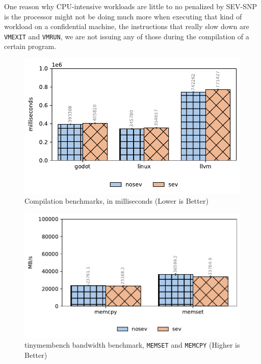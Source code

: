 \documentclass[twocolumn]{article}
\begin{document}
One reason why CPU-intensive workloads are little to no penalized by SEV-SNP is the processor might not be doing much more when executing that kind of workload on a confidential machine, the instructions that really slow down are \texttt{VMEXIT} and \texttt{VMRUN}, we are not issuing any of those during the compilation of a certain program.

\begin{figure}[ht]
    \centering
    \includegraphics[width=\columnwidth]{img/compilation-benchmark.pdf}
    \caption{Compilation benchmarks, in milliseconds (Lower is Better)}
    \label{fig:tb-compilation}
\end{figure}

\begin{figure}[ht]
    \centering
    \includegraphics[width=\columnwidth]{img/tinymembenchmark.pdf}
    \caption{tinymembench bandwidth benchmark, \texttt{MEMSET} and \texttt{MEMCPY} (Higher is Better)}
    \label{fig:tb-tinymembench}
\end{figure}
\end{document}
